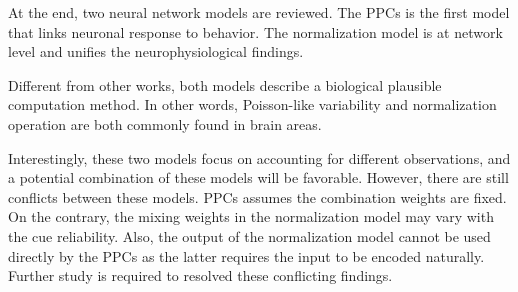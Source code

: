 \documentclass{article}[11pt]
\begin{document}
At the end, two neural network models are reviewed. The PPCs is the first model that links neuronal response to behavior. The normalization model is at network level and unifies the neurophysiological findings.

Different from other works, both models describe a biological plausible computation method. In other words, Poisson-like variability and normalization operation are both commonly found in brain areas.

Interestingly, these two models focus on accounting for different observations, and a potential combination of these models will be favorable. However, there are still conflicts between these models. PPCs assumes the combination weights are fixed. On the contrary, the mixing weights in the normalization model may vary with the cue reliability. Also, the output of the normalization model cannot be used directly by the PPCs as the latter requires the input to be encoded naturally. Further study is required to resolved these conflicting findings.



\end{document}
